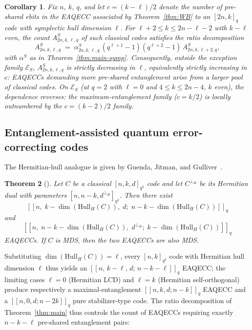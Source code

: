 \documentclass[11pt]{article}
\theoremstyle{plain}
\newtheorem{theorem}{Theorem}
\newtheorem{corollary}[theorem]{Corollary}
\theoremstyle{remark}
\newcommand{\HHull}{\mathrm{Hull}_H}
\begin{document}
\begin{corollary}\label{cor:eaqecc-symp-monotone}
Fix $n$, $k$, $q$, and let $c = (k - \ell)/2$ denote the number of
pre-shared ebits in the EAQECC associated by Theorem~\ref{thm:WB}
to an $[2n,k]_q$ code with symplectic hull dimension $\ell$. For
$\ell + 2 \leq k \leq 2n - \ell - 2$ with $k - \ell$ even, the count
$A^S_{2n,k,\ell,q}$ of such classical codes satisfies the ratio
decomposition
\[
   A^S_{2n,k,\ell,q} \;=\; \alpha^S_{2n,k,\ell,q}\,(q^{\ell+1}-1)(q^{\ell+2}-1)\,
   A^S_{2n,k,\ell+2,q},
\]
with $\alpha^S$ as in Theorem~\ref{thm:main-symp}. Consequently, outside
the exception family $\mathcal{E}_S$, $A^S_{2n,k,\ell,q}$ is strictly
decreasing in $\ell$, equivalently strictly increasing in $c$: EAQECCs
demanding more pre-shared entanglement arise from a larger pool of
classical codes. On $\mathcal{E}_S$ (at $q = 2$ with $\ell = 0$ and
$4 \leq k \leq 2n - 4$, $k$ even), the dependence reverses: the
maximum-entanglement family ($c = k/2$) is locally outnumbered by the
$c = (k-2)/2$ family.
\end{corollary}

\subsection{Entanglement-assisted quantum error-correcting codes}

The Hermitian-hull analogue is given by Guenda, Jitman, and
Gulliver~\cite{Dcc-EAqecc}.

\begin{theorem}[{\cite[Corollary~3.2]{Dcc-EAqecc}}]\label{thm:GJG}
Let $C$ be a classical $[n,k,d]_{q^2}$ code and let $C^{\perp_H}$ be its
Hermitian dual with parameters $[n, n-k, d^{\perp_H}]_{q^2}$. Then there exist
\[
   [[n,\; k - \dim(\HHull(C)),\; d;\; n-k-\dim(\HHull(C))]]_q
\]
and
\[
   [[n,\; n-k - \dim(\HHull(C)),\; d^{\perp_H};\; k-\dim(\HHull(C))]]_q
\]
EAQECCs. If $C$ is MDS, then the two EAQECCs are also MDS.
\end{theorem}

Substituting $\dim(\HHull(C)) = \ell$, every $[n,k]_{q^2}$ code with
Hermitian hull dimension $\ell$ thus yields an
$[[n,\, k - \ell,\, d;\, n-k-\ell]]_q$ EAQECC; the limiting cases
$\ell = 0$ (Hermitian LCD) and $\ell = k$ (Hermitian self-orthogonal) produce
respectively a maximal-entanglement $[[n,k,d;n-k]]_q$ EAQECC and a
$[[n,0,d;n-2k]]_q$ pure stabilizer-type code. The ratio decomposition of
Theorem~\ref{thm:main} thus controls the count of EAQECCs requiring exactly
$n - k - \ell$ pre-shared entanglement pairs:
\end{document}
